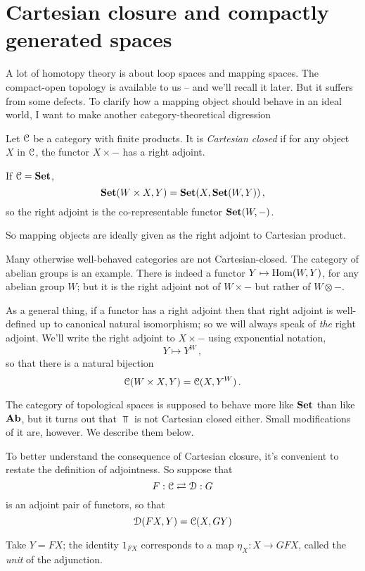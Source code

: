 \section{Cartesian closure and compactly generated spaces}

A lot of homotopy theory is about loop spaces and mapping spaces. 
The compact-open topology is available to us -- and we'll recall it later.
But it suffers from some defects. To clarify how a mapping object
should behave in an ideal world, I want to make another category-theoretical
digression

\begin{definition} Let $\mathcal C$ be a category with finite products. 
It is {\em Cartesian closed} if for any object $X$ in $\mathcal C$, the functor
$X\times-$ has a right adjoint. 
\end{definition}

\begin{example} If $\mathcal C=\mathbf{Set}$, 
\[
\mathbf{Set}(W\times X,Y)=\mathbf{Set}(X,\mathbf{Set}(W,Y))\,,
\]
so the right adjoint is the co-representable functor $\mathbf{Set}(W,-)$. 
\end{example}

So mapping objects are ideally given as the right adjoint to Cartesian
product.

Many otherwise well-behaved categories are not Cartesian-closed. 
The category of abelian groups is an example. There is indeed a functor 
$Y\mapsto\operatorname{Hom}(W,Y)$, for any abelian group $W$; but it is the right adjoint
not of $W\times-$ but rather of $W\otimes-$. 

As a general thing, if a functor has a right adjoint then that right
adjoint is well-defined up to canonical natural isomorphism; so we will
always speak of {\em the} right adjoint. We'll write the right adjoint 
to $X\times-$ using exponential notation,
\[
Y\mapsto Y^W\,,
\]
so that there is a natural bijection
\[
\mathcal C(W\times X,Y)=\mathcal C(X,Y^W)\,.
\]

The category of topological spaces is supposed to behave more like $\mathbf{Set}$
than like $\mathbf{Ab}$, but it turns out that $\Top$ is not Cartesian closed either.
Small modifications of it are, however. We describe them below.

To better understand the consequence of Cartesian closure, it's convenient
to restate the definition of adjointness. So suppose that 
\[
F:\mathcal C\rightleftarrows \mathcal D:G
\]
is an adjoint pair of functors, so that
\[
\mathcal D(FX,Y)=\mathcal C(X,GY)
\]

Take $Y=FX$; the identity $1_{FX}$ corresponds to a map $\eta_X:X\to GFX$,
called the {\em unit} of the adjunction. 

